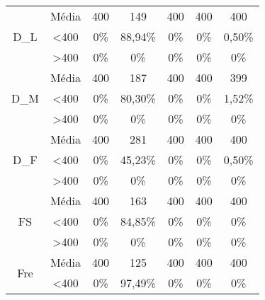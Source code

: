 \begin{table}[]
\begin{tabular}{|c|c|ccccc|}
\multirow{3}{*}{D\_L}           & Média            & 400               & 149               & 400               & 400               & 400               \\
                                & \textless 400    & 0\%            & 88,94\%           & 0\%            & 0\%            & 0,50\%            \\
                                & \textgreater 400 & 0\%            & 0\%            & 0\%            & 0\%            & 0\%            \\ \hline
\multirow{3}{*}{D\_M}           & Média            & 400               & 187               & 400               & 400               & 399               \\
                                & \textless 400    & 0\%            & 80,30\%           & 0\%            & 0\%            & 1,52\%            \\
                                & \textgreater 400 & 0\%            & 0\%            & 0\%            & 0\%            & 0\%            \\ \hline
\multirow{3}{*}{D\_F}           & Média            & 400               & 281               & 400               & 400               & 400               \\
                                & \textless 400    & 0\%            & 45,23\%           & 0\%            & 0\%            & 0,50\%            \\
                                & \textgreater 400 & 0\%            & 0\%            & 0\%            & 0\%            & 0\%            \\ \hline
\multirow{3}{*}{FS}             & Média            & 400               & 163               & 400               & 400               & 400               \\
                                & \textless 400    & 0\%            & 84,85\%           & 0\%            & 0\%            & 0\%            \\
                                & \textgreater 400 & 0\%            & 0\%            & 0\%            & 0\%            & 0\%            \\ \hline
\multirow{3}{*}{Fre}            & Média            & 400               & 125               & 400               & 400               & 400               \\
                                & \textless 400    & 0\%            & 97,49\%           & 0\%            & 0\%            & 0\%            \\

\end{tabular}
\end{table}
